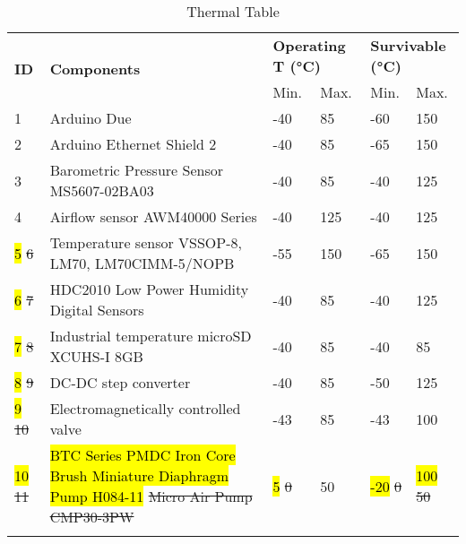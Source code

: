 
\begin{longtable}{|m{1cm}|m{3.5cm}|m{1cm}|m{1cm}|m{1cm}|m{1cm}|}
\hline
\multirow{2}{*}{\textbf{ID}} & \multirow{2}{*}{\textbf{Components}}                                 & \multicolumn{2}{l|}{\textbf{Operating T (°C)}} & \multicolumn{2}{l|}{\textbf{Survivable (°C)}} \\ \cline{3-6} 
                             &                                                                      & Min.                   & Max.                  & Min.                  & Max.                  \\ \hline
1                            & Arduino Due                                                          & -40                    & 85                    & -60                   & 150                   \\ \hline
2                            & Arduino Ethernet Shield 2                                            & -40                    & 85                    & -65                   & 150                   \\ \hline
3                            & Barometric Pressure Sensor MS5607-02BA03                             & -40                    & 85                    & -40                   & 125                   \\ \hline
4                            & Airflow sensor AWM40000 Series                                       & -40                    & 125                   & -40                   & 125                   \\ \hline
\hl{5} \st{6}                            & Temperature sensor VSSOP-8, LM70, LM70CIMM-5/NOPB & -55                    & 150                   & -65                   & 150                   \\ \hline
\hl{6} \st{7}                            & HDC2010 Low Power Humidity Digital Sensors                           & -40                    & 85                    & -40                   & 125                   \\ \hline
\hl{7} \st{8}                            & Industrial temperature microSD XCUHS-I 8GB                           & -40                    & 85                    & -40                   & 85                    \\ \hline
\hl{8} \st{9}                            & DC-DC step converter                                                 & -40                       & 85                       & -50                      & 125                      \\ \hline
\hl{9} \st{10}                           & Electromagnetically controlled valve                                 &  -43                      & 85              & -43                      & 100                      \\ \hline
\hl{10} \st{11}                           & \hl{BTC Series PMDC Iron Core Brush Miniature Diaphragm Pump H084-11} \st{Micro Air Pump CMP30-3PW}                                                             & \hl{5} \st{0}                       & 50                      & \hl{-20} \st{0}                     & \hl{100} \st{50}                      \\ \hline

\caption{Thermal Table}
\label{tab:thermal-table}
\end{longtable}
\raggedbottom